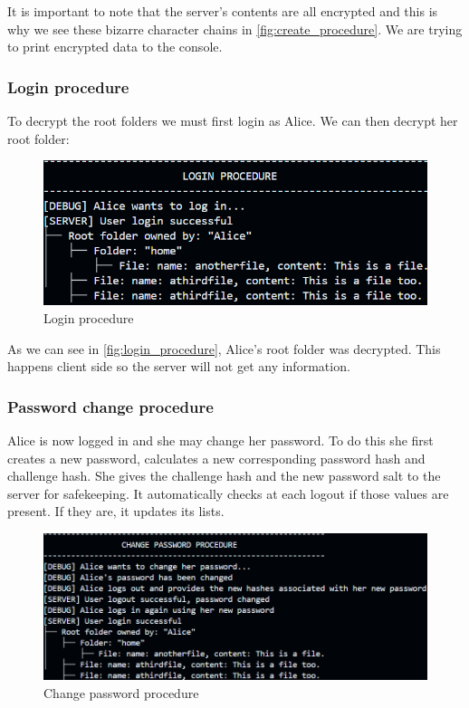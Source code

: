 It is important to note that the server's contents are all encrypted and this is why we see these bizarre character chains in \autoref{fig:create_procedure}. We are trying to print encrypted data to the console.


\subsubsection{Login procedure}
To decrypt the root folders we must first login as Alice. We can then decrypt her root folder:

\begin{figure}[H]
    \centering
    \includegraphics[width=\textwidth]{screenshots/login_procedure.png}
    \caption{Login procedure}
    \label{fig:login_procedure}
\end{figure}

As we can see in \autoref{fig:login_procedure}, Alice's root folder was decrypted. This happens client side so the server will not get any information.

\subsubsection{Password change procedure}
Alice is now logged in and she may change her password. To do this she first creates a new password, calculates a new corresponding password hash and challenge hash. She gives the challenge hash and the new password salt to the server for safekeeping. It automatically checks at each logout if those values are present. If they are, it updates its lists.

\begin{figure}[H]
    \centering
    \includegraphics[width=\textwidth]{screenshots/password_procedure.png}
    \caption{Change password procedure}
    \label{fig:password_procedure}
\end{figure}

